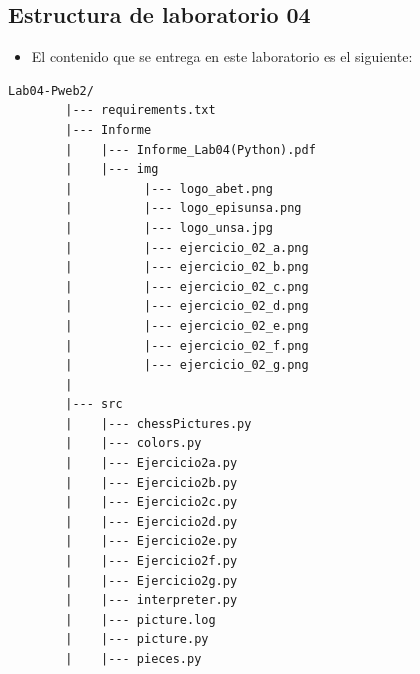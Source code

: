 \documentclass{article}
\begin{document}
	
	
	
	
	
	
	
	
	
	\subsection{Estructura de laboratorio 04}
	\begin{itemize}	
		\item El contenido que se entrega en este laboratorio es el siguiente:
	\end{itemize}
	
	\begin{lstlisting}[style=ascii-tree]
		Lab04-Pweb2/
		|--- requirements.txt
		|--- Informe
		|    |--- Informe_Lab04(Python).pdf
		|    |--- img
		|	       |--- logo_abet.png
		| 	       |--- logo_episunsa.png
		| 	       |--- logo_unsa.jpg
		| 	       |--- ejercicio_02_a.png
		| 	       |--- ejercicio_02_b.png
		| 	       |--- ejercicio_02_c.png
		| 	       |--- ejercicio_02_d.png
		| 	       |--- ejercicio_02_e.png
		| 	       |--- ejercicio_02_f.png
		| 	       |--- ejercicio_02_g.png
		|
		|--- src
		|    |--- chessPictures.py
		|    |--- colors.py
		|    |--- Ejercicio2a.py
		|    |--- Ejercicio2b.py
		|    |--- Ejercicio2c.py
		|    |--- Ejercicio2d.py
		|    |--- Ejercicio2e.py
		|    |--- Ejercicio2f.py
		|    |--- Ejercicio2g.py
		|    |--- interpreter.py
		|    |--- picture.log
		|    |--- picture.py
		|    |--- pieces.py
	\end{lstlisting}
	
\end{document}
